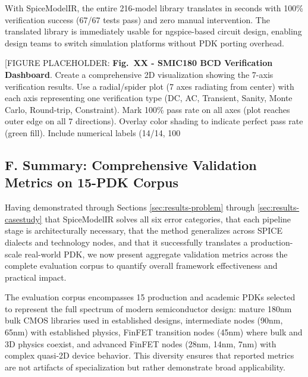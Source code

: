 \documentclass[conference]{IEEEtran}
\begin{document}
With SpiceModelIR, the entire 216-model library translates in seconds with 100\% verification success (67/67 tests pass) and zero manual intervention. The translated library is immediately usable for ngspice-based circuit design, enabling design teams to switch simulation platforms without PDK porting overhead.

[FIGURE PLACEHOLDER: \textbf{Fig.~XX - SMIC180 BCD Verification Dashboard}. Create a comprehensive 2D visualization showing the 7-axis verification results. Use a radial/spider plot (7 axes radiating from center) with each axis representing one verification type (DC, AC, Transient, Sanity, Monte Carlo, Round-trip, Constraint). Mark 100\% pass rate on all axes (plot reaches outer edge on all 7 directions). Overlay color shading to indicate perfect pass rate (green fill). Include numerical labels (14/14, 100%

\subsection{F. Summary: Comprehensive Validation Metrics on 15-PDK Corpus}
\label{sec:results-summary}

Having demonstrated through Sections \ref{sec:results-problem} through \ref{sec:results-casestudy} that SpiceModelIR solves all six error categories, that each pipeline stage is architecturally necessary, that the method generalizes across SPICE dialects and technology nodes, and that it successfully translates a production-scale real-world PDK, we now present aggregate validation metrics across the complete evaluation corpus to quantify overall framework effectiveness and practical impact.

The evaluation corpus encompasses 15 production and academic PDKs selected to represent the full spectrum of modern semiconductor design: mature 180nm bulk CMOS libraries used in established designs, intermediate nodes (90nm, 65nm) with established physics, FinFET transition nodes (45nm) where bulk and 3D physics coexist, and advanced FinFET nodes (28nm, 14nm, 7nm) with complex quasi-2D device behavior. This diversity ensures that reported metrics are not artifacts of specialization but rather demonstrate broad applicability.
\end{document}
